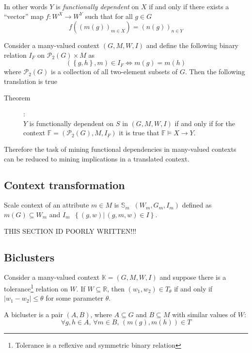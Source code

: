 \documentclass[a4paper]{article}
\newcommand{\obj}[1]{{\left\{ #1 \right \}}}
\newcommand{\brac}[1]{{\left ( #1 \right )}}
\newcommand{\induc}[1]{{\left . #1 \right \vert}}
\newcommand{\abs}[1]{{\left | #1 \right |}}
\newcommand{\Real}{\mathbb{R}}
\newcommand{\Pwr}{\mathcal{P}}
\newcommand{\Ctx}{\mathbb{K}}
\newcommand{\defn}{\mathop{\overset{\Delta}{=}}\nolimits}
\begin{document}
In other words $Y$ is \emph{functionally dependent} on $X$ if and only if there exists a ``vector'' map $f: W^X\to W^Y$ such that for all $g\in G$ \[f\brac{\brac{m(g)}_{m\in X}} = \brac{n(g)}_{n\in Y}\] 

Consider a many-valued context $\brac{G,M,W,I}$ and define the following binary relation $I_F$ on $\Pwr_2{(G)}\times M$ as \[\brac{\obj{g,h},m}\in I_F \Leftrightarrow m(g)=m(h)\] where $\Pwr_2{(G)}$ is a collection of all two-element subsets of $G$. Then the following translation is true \begin{description}
	\item[Theorem]:\hfill \\
	$Y$ is functionally dependent on $S$ in $\brac{G,M,W,I}$ if and only if for the context $\mathbb{F} = \brac{\Pwr_2{(G)}, M, I_F}$ it is true that $\mathbb{F}\models X\to Y$.
\end{description}
Therefore the task of mining functional dependencies in many-valued contexts can be reduced to mining implications in a translated context.


\subsection{Context transformation} %
\label{sub:context_transformation}

Scale context of an attribute $m\in M$ is $\mathbb{S}_m\defn \brac{W_m, G_m, I_m}$ defined as $m(G) \subseteq W_m$ and $I_m\defn \obj{ \induc{(g,w)}\,(g,m,w)\in I }$.

THIS SECTION ID POORLY WRITTEN!!!


\subsection{Biclusters} %
\label{sub:biclusters}
Consider a many-valued context $\Ctx=\brac{G,M,W,I}$ and suppose there is a tolerance\footnote{Tolerance is a reflexive and symmetric binary relation} relation on $W$. If $W\subseteq \Real$, then $(w_1,w_2)\in T_\theta$ if and only if $\abs{w_1-w_2}\leq \theta$ for some parameter $\theta$.

A bicluster is a pair $(A,B)$, where $A\subseteq G$ and $B\subseteq M$ with similar values of $W$:\[\forall g,h\in A,\, \forall m\in B,\,\brac{m(g), m(h)}\in T\]
\end{document}
